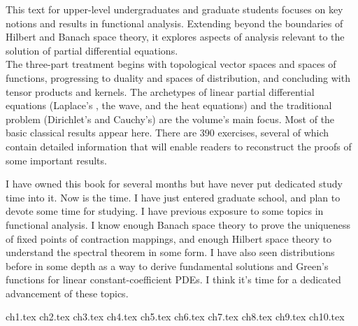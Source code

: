 \documentclass{../booknotes}
\begin{document}
	\maketitle

	\begin{pubdescrip}
		This text for upper-level undergraduates and graduate students focuses on key notions and results in functional analysis. Extending beyond the boundaries of Hilbert and Banach space theory, it explores aspects of analysis relevant to the solution of partial differential equations. \\
		\indent The three-part treatment begins with topological vector spaces and spaces of functions, progressing to duality and spaces of distribution, and concluding with tensor products and kernels. The archetypes of linear partial differential equations (Laplace's , the wave, and the heat equations) and the traditional problem (Dirichlet's and Cauchy's) are the volume's main focus. Most of the basic classical results appear here. There are 390 exercises, several of which contain detailed information that will enable readers to reconstruct the proofs of some important results.
	\end{pubdescrip}

	\begin{transcribernote}
		\indent I have owned this book for several months but have never put dedicated study time into it. Now is the time. I have just entered graduate school, and plan to devote some time for studying. I have previous exposure to some topics in functional analysis. I know enough Banach space theory to prove the uniqueness of fixed points of contraction mappings, and enough Hilbert space theory to understand the spectral theorem in some form. I have also seen distributions before in some depth as a way to derive fundamental solutions and Green's functions for linear constant-coefficient PDEs. I think it's time for a dedicated advancement of these topics.
	\end{transcribernote}
	
	{ch1.tex}
	{ch2.tex}
	{ch3.tex}
	{ch4.tex}
	{ch5.tex}
	{ch6.tex}
	{ch7.tex}
	{ch8.tex}
	{ch9.tex}
	{ch10.tex}
	
\end{document}
